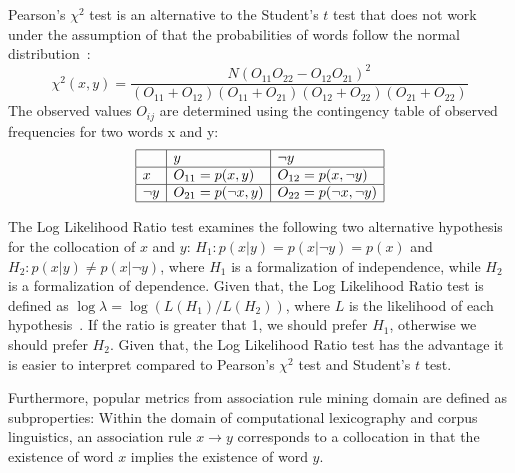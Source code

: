 \begin{definition}
Pearson's $\chi^{2}$ test is an alternative to the Student's $t$ test that does not work under
the assumption of that the probabilities of words follow the normal distribution~\citep{Manning1999}: 
\[
\chi^{2}(x,y) = \frac{ N ( O_{11} O_{22} - O_{12} O_{21} )^{2} }{ ( O_{11} + O_{12} ) (O_{11} + O_{21}) ( O_{12} + O_{22} ) ( O_{21} + O_{22} ) }
\]
The observed values $O_{ij}$ are determined using the contingency table of observed frequencies for two words x and y: 
\[
\begin{matrix}
\begin{array}{|l|l|l|}
\hline
           &  y                           &  \neg y \\ \hline
x      & O_{11} = p(x, y)         & O_{12} = p(x, \neg y) \\\hline
\neg y & O_{21} = p(\neg x, y)    & O_{22} = p(\neg x, \neg y)\\\hline
\end{array}
\end{matrix}
\]
\end{definition}



\begin{definition}
The Log Likelihood Ratio test examines the following two alternative hypothesis for the collocation 
of $x$ and $y$: $H_1\colon p(x|y) = p(x|\neg y) = p(x)$ and $H_2\colon p(x|y) \neq p(x|\neg y)$, where $H_1$ 
is a formalization of independence, while $H_2$ is a formalization of dependence. Given that, 
the Log Likelihood Ratio test is defined as $\log \lambda = \log (L(H_1)/L(H_2))$, where $L$
is the likelihood of each hypothesis~\citep{Manning1999}. If the ratio is greater that 1, we should 
prefer $H_1$, otherwise we should prefer $H_2$. Given that, the Log Likelihood Ratio test has the
advantage it is easier to interpret compared to Pearson's $\chi^{2}$ test and Student's $t$ test.
\end{definition}

\noindent Furthermore, popular metrics from association rule mining domain are defined as 
 subproperties: Within the domain of computational lexicography and corpus
linguistics, an association rule $x \rightarrow y$ corresponds to a collocation in that 
the existence of word $x$ implies the existence of word $y$.



